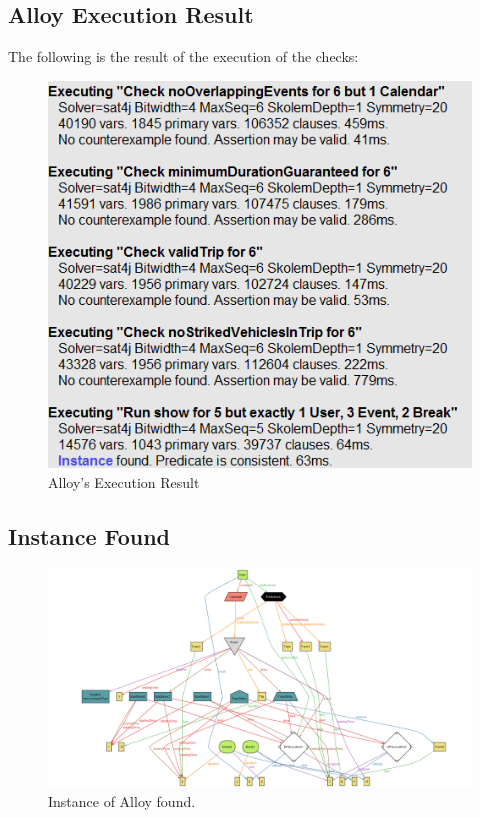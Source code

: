 \subsection{Alloy Execution Result}
The following is the result of the execution of the checks:\\
\begin{figure}[H]
\begin{center}
		\includegraphics[width=\textwidth, keepaspectratio=true]{Img/AlloyEx}
		\caption{Alloy's Execution Result}
\end{center}
\end{figure}
\clearpage
\subsection*{Instance Found}

\begin{figure}[H]
\begin{center}
	\includegraphics[width=\textwidth, height=\textheight, angle=90, keepaspectratio=true]{Img/AlloyInstance}
	\caption{Instance of Alloy found.}
	\label{AlloyInstance}
\end{center}
\end{figure}

